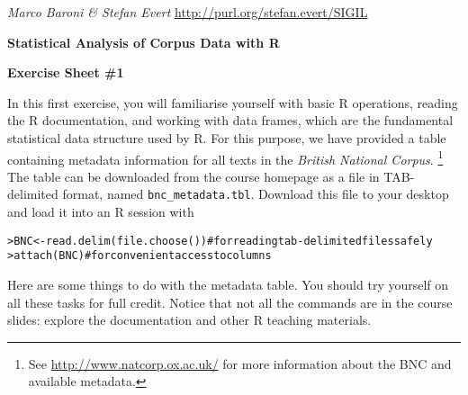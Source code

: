 \documentclass[a4paper,12pt]{article}
\newcommand{\REM}[1]{\textrm{\color[rgb]{.7,.2,.1}\# #1}}
\begin{document}
\emph{Marco Baroni \& Stefan Evert} \hfill %
{\small \url{http://purl.org/stefan.evert/SIGIL}}

\begin{center}
  \textbf{\Large Statistical Analysis of Corpus Data with R}

  \textbf{\large Exercise Sheet \#1}
\end{center}

In this first exercise, you will familiarise yourself with basic R
operations, reading the R documentation, and working with data frames, which
are the fundamental statistical data structure used by R.  For this purpose,
we have provided a table containing metadata information for all texts in the
\emph{British National Corpus}.%
\footnote{See \url{http://www.natcorp.ox.ac.uk/} for more information about
  the BNC and available metadata.} %
The table can be downloaded from the course homepage as a file in
TAB-delimited format, named \verb|bnc_metadata.tbl|.  Download this file to
your desktop and load it into an R session with

\begin{alltt}
  > BNC <- read.delim(file.choose()) \REM{for reading tab-delimited files safely}
  > attach(BNC)                      \REM{for convenient access to columns}
\end{alltt}

Here are some things to do with the metadata table.  You should try yourself
on all these tasks for full credit. Notice that not all the commands are in
the course slides: explore the documentation and other R teaching materials.
\end{document}
